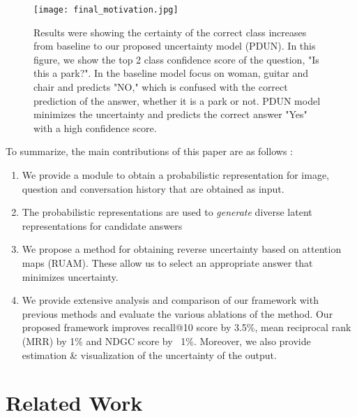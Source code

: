 \documentclass[review]{elsarticle}
\begin{document}
\vspace{-1em}
\begin{figure}[ht]
	\centering
\texttt{[image: final\_motivation.jpg]}
	\vspace{-1em}
	\caption{Results were showing the certainty of the correct class increases from baseline\cite{Das_ICCV2017} to our proposed uncertainty model (PDUN). In this figure, we show the top 2 class confidence score of the question, "Is this a park?". In the baseline model focus on woman, guitar and chair and predicts "NO," which is confused with the correct prediction of the answer, whether it is a park or not. PDUN model minimizes the uncertainty and predicts the correct answer "Yes" with a high confidence score.}
	\label{fig:result_0_B}
\end{figure}

To summarize, the main contributions of this paper are as follows :
\begin{enumerate}
	\item We provide a module to obtain a probabilistic representation for image, question and conversation history that are obtained as input. 
	\item The probabilistic representations are used to {\it{generate}} diverse latent representations for candidate answers
	\item We propose a method for obtaining reverse uncertainty based on attention maps (RUAM). These allow us to select an appropriate answer that minimizes uncertainty.
	\item We provide extensive analysis and comparison of our framework with previous methods and evaluate the various ablations of the method. Our proposed framework improves recall@10 score by 3.5\%,  mean reciprocal rank (MRR) by 1\% and NDGC score by ~1\%.  Moreover, we also  provide estimation \& visualization of the uncertainty of the output.
\end{enumerate}













\section{Related Work}
\label{sec:lit_surv}
\end{document}
